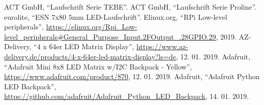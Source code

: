 \documentclass[conference]{IEEEtran}
\begin{document}
\begin{thebibliography}{00}
  ACT GmbH,
  ``Laufschrift Serie TEBE''.
  ACT GmbH,
  ``Laufschrift Serie Proline''.
  eurolite,
  ``ESN 7x80 5mm LED-Laufschrift''.
  Elinux.org,
  ``RPi Low-level peripherals'',
  \url{https://elinux.org/Rpi_Low-level_peripherals#General_Purpose_Input.2FOutput_.28GPIO.29},
  2019.
  AZ-Delivery,
  ``4 x 64er LED Matrix Display'',
  \url{https://www.az-delivery.de/products/4-x-64er-led-matrix-display?ls=de},
  12. 01. 2019.
  Adafruit,
  ``Adafruit Mini 8x8 LED Matrix w/I2C Backpack - Yellow'',
  \url{https://www.adafruit.com/product/870},
  12. 01. 2019.
  Adafruit,
  ``Adafruit Python LED Backpack'',
  \url{https://github.com/adafruit/Adafruit_Python_LED_Backpack},
  14. 01. 2019.
\end{thebibliography}
\end{document}
